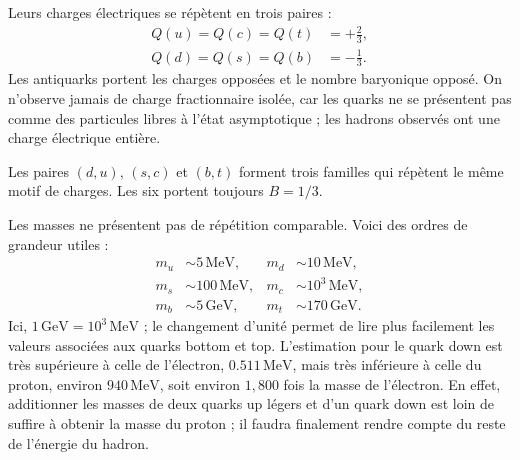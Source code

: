 Leurs charges électriques se répètent en trois paires :
\begin{equation}
\begin{aligned}
Q(u)=Q(c)=Q(t)&=+\frac23,
\\
Q(d)=Q(s)=Q(b)&=-\frac13.
\end{aligned}
\end{equation}
Les antiquarks portent les charges opposées et le nombre baryonique opposé. On n’observe jamais de charge fractionnaire isolée, car les quarks ne se présentent pas comme des particules libres à l’état asymptotique ; les hadrons observés ont une charge électrique entière.

Les paires \((d,u)\), \((s,c)\) et \((b,t)\) forment trois familles qui répètent le même motif de charges. Les six portent toujours \(B=1/3\).

\begin{classroomqa}
\end{classroomqa}

Les masses ne présentent pas de répétition comparable. Voici des ordres de grandeur utiles :
\begin{align}
m_u &\sim 5\,\mathrm{MeV},
&
m_d &\sim 10\,\mathrm{MeV},
\\
m_s &\sim 100\,\mathrm{MeV},
&
m_c &\sim 10^3\,\mathrm{MeV},
\\
m_b &\sim 5\,\mathrm{GeV},
&
m_t &\sim 170\,\mathrm{GeV}.
\end{align}
Ici, \(1\,\mathrm{GeV}=10^3\,\mathrm{MeV}\) ; le changement d’unité permet de lire plus facilement les valeurs associées aux quarks bottom et top. L’estimation pour le quark down est très supérieure à celle de l’électron, \(0.511\,\mathrm{MeV}\), mais très inférieure à celle du proton, environ \(940\,\mathrm{MeV}\), soit environ \(1{,}800\) fois la masse de l’électron. En effet, additionner les masses de deux quarks up légers et d’un quark down est loin de suffire à obtenir la masse du proton ; il faudra finalement rendre compte du reste de l’énergie du hadron.



